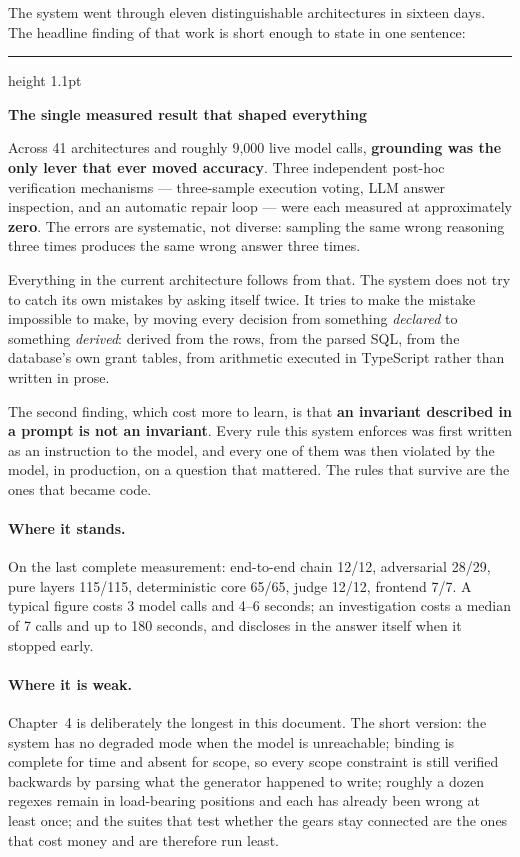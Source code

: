 \documentclass[11pt,a4paper]{report}
\newenvironment{keybox}[1]
 {\par\medskip\begin{center}\begin{minipage}{0.94\textwidth}%
  {\color{navy}\hrule height 1.1pt}\vspace{5pt}\par
  \textbf{\color{navy}#1}\par\vspace{3pt}\small}
 {\par\vspace{5pt}{\color{mist}\hrule height 0.8pt}\end{minipage}\end{center}\medskip}
\begin{document}
The system went through eleven distinguishable architectures in sixteen days. The headline finding
of that work is short enough to state in one sentence:

\begin{keybox}{The single measured result that shaped everything}
Across 41 architectures and roughly 9{,}000 live model calls, \textbf{grounding was the only lever
that ever moved accuracy}. Three independent post-hoc verification mechanisms --- three-sample
execution voting, LLM answer inspection, and an automatic repair loop --- were each measured
at approximately \textbf{zero}. The errors are systematic, not diverse: sampling the same wrong
reasoning three times produces the same wrong answer three times.
\end{keybox}

Everything in the current architecture follows from that. The system does not try to catch its own
mistakes by asking itself twice. It tries to make the mistake impossible to make, by moving every
decision from something \emph{declared} to something \emph{derived}: derived from the rows, from
the parsed SQL, from the database's own grant tables, from arithmetic executed in TypeScript
rather than written in prose.

The second finding, which cost more to learn, is that \textbf{an invariant described in a prompt is
not an invariant}. Every rule this system enforces was first written as an instruction to the
model, and every one of them was then violated by the model, in production, on a question that
mattered. The rules that survive are the ones that became code.

\paragraph{Where it stands.} On the last complete measurement: end-to-end chain 12/12, adversarial
28/29, pure layers 115/115, deterministic core 65/65, judge 12/12, frontend 7/7. A typical figure
costs 3 model calls and 4--6 seconds; an investigation costs a median of 7 calls and up to 180
seconds, and discloses in the answer itself when it stopped early.

\paragraph{Where it is weak.} Chapter~4 is deliberately the longest in this document. The short
version: the system has no degraded mode when the model is unreachable; binding is complete for
time and absent for scope, so every scope constraint is still verified backwards by parsing what
the generator happened to write; roughly a dozen regexes remain in load-bearing positions and each
has already been wrong at least once; and the suites that test whether the gears stay connected
are the ones that cost money and are therefore run least.
\end{document}
